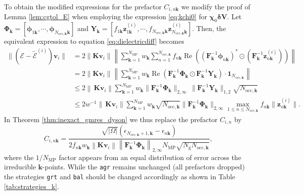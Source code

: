 \documentclass[hidelinks,onefignum,onetabnum]{siamart250211}
\newcommand{\Real}{\operatorname{Re}}
\newcommand{\Nocck}{N_{\mathrm{occ},\bm{k}}}
\newcommand{\Ng}{N_{\mathrm{g}}}
\newcommand{\Nmp}{N_{\text{MP}}}
\newcommand{\sbal}{\texttt{bal}\xspace}
\newcommand{\sagr}{\texttt{agr}\xspace}
\newcommand{\sgrt}{\texttt{grt}\xspace}
\begin{document}
To obtain the modified expressions for the prefactor
$C_{i,n {\bm k}}$ we modify the proof of Lemma \ref{lem:cgtol_E}
when employing the expression \eqref{eq:kchi0} for $\bm \chi_0 \bm{\delta V}$.
Let $\bm{\Phi}_{\bm k} = [\bm{\phi}_{1 \bm k}, \cdots,\allowbreak \bm{\phi}_{\Nocck \bm k}]$ and $\bm{Y}_{\bm k} = [f_{1 \bm k} \bm z_{1 \bm k}^{(i)}, \cdots, f_{\Nocck \bm k} \bm z_{\Nocck \bm k}^{(i)}]$.
Then, the equivalent expression to
equation \eqref{eq:dielectricdiff} becomes
\begin{equation}
      \begin{aligned}
          \| (\bm{\mathcal E} - \widetilde{\bm{\mathcal E}}^{(i)}) \bm{v}_i\| &= 2 \left\| \bm K \bm{v}_i\right\| \left\| \sum_{\bm k =1}^{\Nmp} w_{\bm k} \sum_{n=1}^{\Nocck} f_{n\bm k} \Real \left( \left(\bm F_{\bm k}^{-1} \bm{\phi}_{n \bm k}\right)^* \odot \left( \bm F_{\bm k}^{-1} \bm{z}_{n\bm k}^{(i)} \right) \right) \right\|                                                             \\
          & = 2 \left\| \bm K \bm{v}_i\right\| \left\| \sum_{\bm k =1}^{\Nmp} w_{\bm k} \Real\left(\bm{F}_{\bm k}^{-1}\bm{\Phi}_{\bm k} \odot \bm{F}_{\bm k}^{-1}\bm{Y}_{\bm k}\right) \cdot \bm{1}_{\Nocck} \right\| \\
          & \leq 2 \left\| \, \bm K \bm{v}_i\right\| \sum_{\bm k =1}^{\Nmp} w_{\bm k}\|\bm{F}_{\bm k}^{-1}\bm{\Phi}_{\bm k}\|_{2,\infty} \, \|\bm{F}_{\bm k}^{-1}\bm{Y}_{\bm k}\|_{1,2} \sqrt{\Nocck}\\
          & \leq 2 w^{-1} \left\| \, \bm K \bm{v}_i\right\| \sum_{\bm k =1}^{\Nmp} w_{\bm k} \sqrt{\Nocck}\|\bm{F}_{\bm k}^{-1}\bm{\Phi}_{\bm k}\|_{2,\infty} \max_{1\leq n \leq \Nocck} f_{n \bm k} \|\bm{z}_{n\bm k}^{(i)}\|.
      \end{aligned}
\end{equation}
In Theorem \ref{thm:inexact_gmres_dyson} we thus replace the prefactor $C_{i,n}$ by
\begin{equation}
    C_{i,n\bm k} = \dfrac{\sqrt{|\Omega|}(\epsilon_{\Nocck + 1,\bm k} - \epsilon_{n\bm k})}{2 f_{n {\bm k}} w_{\bm k} \left\| \bm K \bm v_i \right\| \left\|\bm{F}_{\bm k}^{-1}\bm{\Phi}_{\bm k} \right\|_{2,\infty} \Nmp \sqrt{\Ng\Nocck} },
\end{equation}
where the $1 / \Nmp$ factor appears from an equal distribution of error
across the irreducible $\bm k$-points.
While the \sagr remains unchanged (all prefactors dropped)
the strategies \sgrt and \sbal should be changed accordingly
as shown in Table \ref{tab:strategies_k}.
\end{document}
